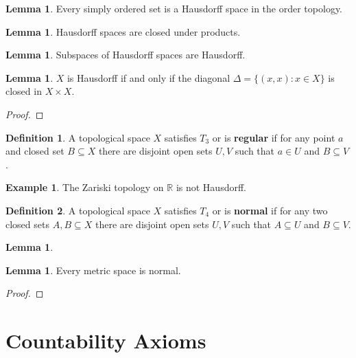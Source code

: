 \documentclass{article}
\theoremstyle{definition}
\newtheorem{definition}{Definition}
\newtheorem{lemma}[theorem]{Lemma}
\newtheorem{example}{Example}[theorem]
\newcommand{\R}{\mathbb{R}}
\begin{document}
\begin{lemma}
    Every simply ordered set is a Hausdorff space in the order topology.
\end{lemma}

\begin{lemma}
    Hausdorff spaces are closed under products.
\end{lemma}

\begin{lemma}
    Subspaces of Hausdorff spaces are Hausdorff.
\end{lemma}

\begin{lemma}
    $X$ is Hausdorff if and only if the diagonal $\Delta = \{ (x,x): x \in X \}$
    is closed in $X \times X$.
\end{lemma}
\begin{proof}
    
\end{proof}


\begin{definition}
    A topological space $X$ satisfies $T_{3}$ or is \textbf{regular} if for any point $a$ and closed set
    $B \subseteq X$ there are disjoint open sets $U,V$ such that $a \in U$ and $B \subseteq V$.
\end{definition}

\begin{example}
    The Zariski topology on $\R$ is not Hausdorff.
\end{example}

\begin{definition}
    A topological space $X$ satisfies $T_{4}$ or is \textbf{normal} if for any two closed sets
    $A,B \subseteq X$ there are disjoint open sets $U,V$ such that $A \subseteq U$ and $B \subseteq V$.
\end{definition}

\begin{lemma}
    
\end{lemma}

\begin{lemma}
    Every metric space is normal.
\end{lemma}
\begin{proof}
    
\end{proof}

\newpage

\section{Countability Axioms}
\end{document}
